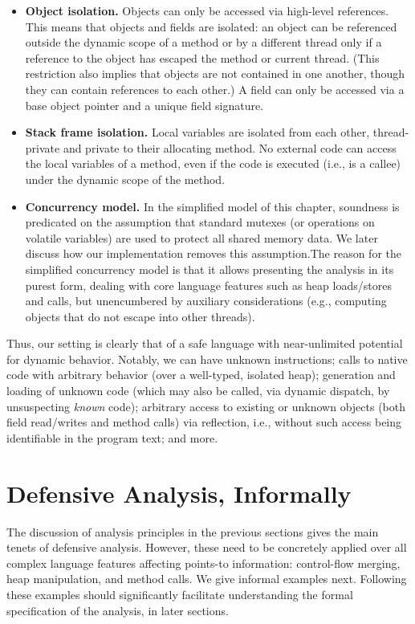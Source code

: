 \begin{itemize}
\item \textbf{Object isolation.} Objects can only be accessed via high-level references. This means that objects and fields are isolated: an object can be referenced outside the dynamic scope of a method or by a different thread only if a reference to the object has escaped the method or current thread. (This restriction also implies that objects are not contained in one another, though they can contain references to each other.) A field can only be accessed via a base object pointer and a unique field signature.

\item \textbf{Stack frame isolation.} Local variables are isolated from each other, thread-private and private to their allocating method. No external code can access the local variables of a method, even if the code is executed (i.e., is a callee) under the dynamic scope of the method.

\item \textbf{Concurrency model.} In the simplified model of this chapter, soundness is predicated on the assumption that standard mutexes (or operations on volatile variables) are used to protect all shared memory data. We later discuss how our implementation removes this assumption.{The reason for the simplified concurrency model is that it allows presenting the analysis in its purest form, dealing with core language features such as heap loads/stores and calls, but unencumbered by auxiliary considerations (e.g., computing objects that do not escape into other threads).}
\end{itemize}

Thus, our setting is clearly that of a safe language with near-unlimited potential for dynamic behavior. Notably, we can have unknown instructions; calls to native code with arbitrary behavior (over a well-typed, isolated heap); generation and loading of unknown code (which may also be called, via dynamic dispatch, by unsuspecting \emph{known} code); arbitrary access to existing or unknown objects (both field read/writes and method calls) via reflection, i.e., without such access being identifiable in the program text; and more.


\section{Defensive Analysis, Informally}
\label{sec:sound:analysis-informally}

The discussion of analysis principles in the previous sections gives the main tenets of defensive analysis. However, these need to be concretely applied over all complex language features affecting points-to information: control-flow merging, heap manipulation, and method calls. We give informal examples next. Following these examples should significantly facilitate understanding the formal specification of the analysis, in later sections.

